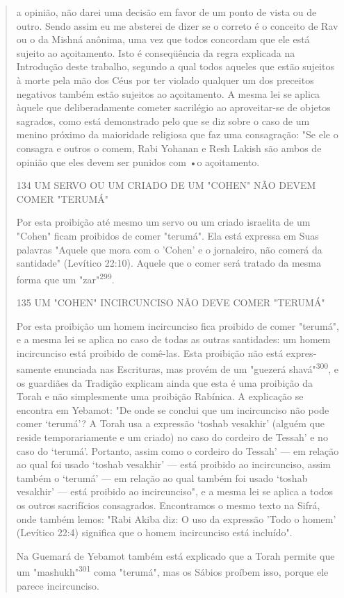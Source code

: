 \begin{quote}
a opinião, não darei uma decisão em favor de um ponto de vista ou de
outro. Sendo assim eu me absterei de dizer se o correto é o conceito de
Rav ou o da Mishná anônima, uma vez que todos concordam que ele está
sujeito ao açoita­mento. Isto é conseqüência da regra explicada na
Introdução deste trabalho, segundo a qual todos aqueles que estão
sujeitos à morte pela mão dos Céus por ter violado qualquer um dos
preceitos negativos também estão sujeitos ao açoitamento. A mesma lei se
aplica àquele que deliberadamente cometer sacri­légio ao aproveitar-se
de objetos sagrados, como está demonstrado pelo que se diz sobre o caso
de um menino próximo da maioridade religiosa que faz uma consagração:
"Se ele o consagra e outros o comem, Rabi Yohanan e Resh La­kish são
ambos de opinião que eles devem ser punidos com •o açoitamento.

134 UM SERVO OU UM CRIADO DE UM "COHEN" NÃO DEVEM COMER "TERUMÁ"

Por esta proibição até mesmo um servo ou um criado israelita de um
"Cohen" ficam proibidos de comer "terumá". Ela está expressa em Suas
pala­vras "Aquele que mora com o 'Cohen' e o jornaleiro, não comerá da
santida­de" (Levítico 22:10). Aquele que o comer será tratado da mesma
forma que um "zar"\textsuperscript{299}.

135 UM "COHEN" INCIRCUNCISO NÃO DEVE COMER "TERUMÁ"

Por esta proibição um homem incircunciso fica proibido de comer
"terumá", e a mesma lei se aplica no caso de todas as outras santidades:
um homem incircunciso está proibido de comê-las. Esta proibição não está
expres­samente enunciada nas Escrituras, mas provém de um "guezerá
shavá"\textsuperscript{300}, e os guardiães da Tradição explicam ainda
que esta é uma proibição da Torah e não simplesmente uma proibição
Rabínica. A explicação se encontra em Ye­bamot: "De onde se conclui que
um incircunciso não pode comer `terumá'? A Torah usa a expressão `toshab
vesakhir' (alguém que reside temporariamente e um criado) no caso do
cordeiro de Tessah' e no caso do `terumá'. Portanto, assim como o
cordeiro do Tessah' --- em relação ao qual foi usado `toshab ve­sakhir'
--- está proibido ao incircunciso, assim também o `terumá' --- em
rela­ção ao qual também foi usado `toshab vesakhir' --- está proibido ao
incircunci­so", e a mesma lei se aplica a todos os outros sacrifícios
consagrados. Encon­tramos o mesmo texto na Sifrá, onde também lemos:
"Rabi Akiba diz: O uso da expressão 'Todo o homem' (Levítico 22:4)
significa que o homem incircun­ciso está incluído".

Na Guemará de Yebamot também está explicado que a Torah per­mite que um
"mashukh"\textsuperscript{301} coma "terumá", mas os Sábios proíbem
isso, por­que ele parece incircunciso.
\end{quote}

